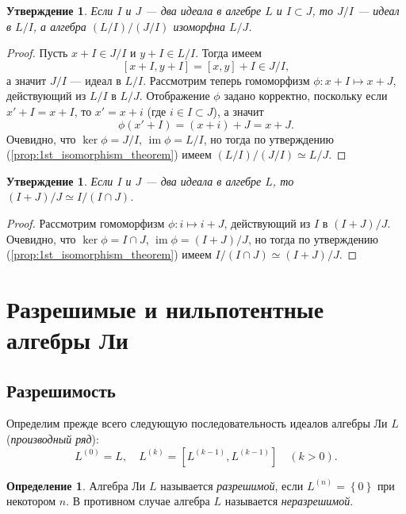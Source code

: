 \documentclass[a4paper, 12pt]{article}
\newtheorem{proposition}[theorem]{Утверждение}
\theoremstyle{definition}
\newtheorem{definition}{Определение}[section]
\begin{document}
\begin{proposition}
    Если \({ I }\) и \({ J }\) --- два идеала в алгебре \({ L }\) и \({ I \subset J }\), то \({ J / I }\) --- идеал в \({ L / I }\), а алгебра \({ (L / I) / (J / I) }\) изоморфна \({ L / J }\).
\end{proposition}
\begin{proof}
    Пусть \({ x + I \in J / I }\) и \({ y + I \in L / I }\). Тогда имеем
    \[
        [x + I, y + I] = [x, y] + I \in J / I,
    \]
    а значит \({ J / I }\) --- идеал в \({ L / I }\). Рассмотрим теперь гомоморфизм \({ \phi : x + I \mapsto x + J }\), действующий из \({ L / I }\) в \({ L / J }\). Отображение \({ \phi }\) задано корректно, поскольку если \({ x' + I = x + I }\), то \({ x' = x + i }\) (где \({ i \in I \subset J }\)), а значит
    \[
        \phi(x' + I) = (x + i) + J = x + J.
    \]
    Очевидно, что \({ \ker \phi = J / I }\), \({ \operatorname{im} \phi = L / I }\), но тогда по утверждению (\ref{prop:1st_isomorphism_theorem}) имеем \( (L / I) / (J / I) \simeq L / J \).
\end{proof}

\begin{proposition}
    Если \({ I }\) и \({ J }\) --- два идеала в алгебре \({ L }\), то \({ (I + J) / J \simeq I / (I \cap J) }\).
\end{proposition}
\begin{proof}
    Рассмотрим гомоморфизм \({ \phi : i \mapsto i + J }\), действующий из \({ I }\) в \({ (I + J) / J }\). Очевидно, что \({ \ker \phi = I \cap J }\), \({ \operatorname{im} \phi = (I + J) / J }\), но тогда по утверждению (\ref{prop:1st_isomorphism_theorem}) имеем \({ I / (I \cap J) \simeq (I + J) / J }\).
\end{proof}

\section{Разрешимые и нильпотентные алгебры Ли}
\subsection{Разрешимость}

Определим прежде всего следующую последовательность идеалов алгебры Ли \({ L }\) (\textit{производный ряд}):
\[
    L^{(0)} = L, \quad L^{(k)} = [L^{(k - 1)}, L^{(k - 1)}] \quad (k > 0).
\]

\begin{definition}
Алгебра Ли \({ L }\) называется \textit{разрешимой}, если \({ L^{(n)} = \left\{ 0 \right\} }\) при некотором \({ n }\). В противном случае алгебра \({ L }\) называется \textit{неразрешимой}.
\end{definition}
\end{document}
